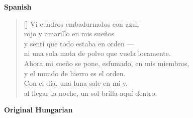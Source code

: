 \documentclass[a4paper,12pt,twoside,final]{book}
\begin{document}
\bigskip

\noindent \textbf{Spanish}


\settowidth{\versewidth}{Ahora mi sueño se pone, esfumado, en mis miembros,}

\begin{verse}[\versewidth]
  Vi cuadros embadurnados con azul, \\
  rojo y amarillo en mis sueños \\
  y sentí que todo estaba en orden --- \\
  ni una sola mota de polvo que vuela locamente. \\
  Ahora mi sueño se pone, esfumado, en mis miembros, \\
  y el mundo de hierro es el orden. \\
  Con el día, una luna sale en mí y, \\
  al llegar la noche, un sol brilla aquí dentro. \\
\end{verse}

\newpage


\noindent \textbf{Original Hungarian}



\settowidth{\versewidth}{Nappal hold kél bennem s ha kinn van}
\end{document}
